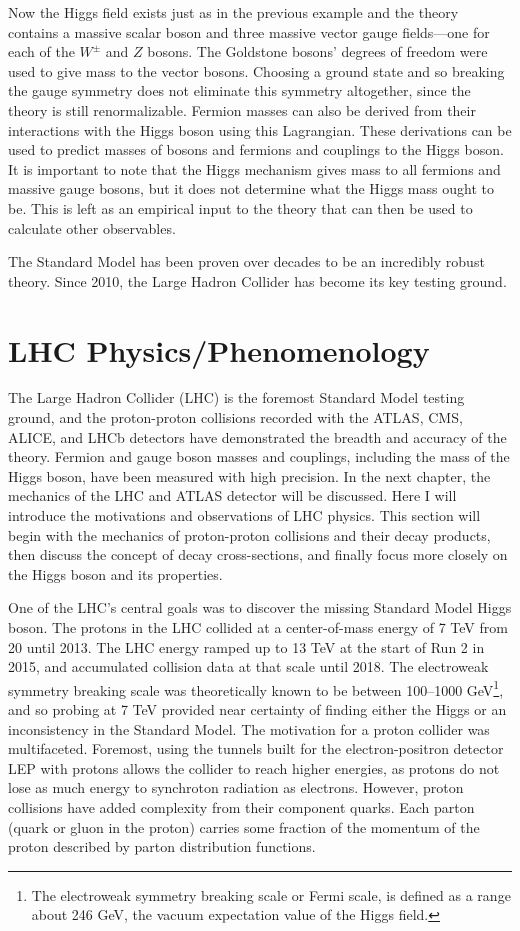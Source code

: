 Now the Higgs field exists just as in the previous example and the theory contains a massive scalar boson and three massive vector gauge fields---one for each of the $W^\pm$ and $Z$ bosons. The Goldstone bosons' degrees of freedom were used to give mass to the vector bosons. Choosing a ground state and so breaking the gauge symmetry does not eliminate this symmetry altogether, since the theory is still renormalizable. Fermion masses can also be derived from their interactions with the Higgs boson using this Lagrangian. These derivations can be used to predict masses of bosons and fermions and couplings to the Higgs boson. It is important to note that the Higgs mechanism gives mass to all fermions and massive gauge bosons, but it does not determine what the Higgs mass ought to be. This is left as an empirical input to the theory that can then be used to calculate other observables. 

The Standard Model has been proven over decades to be an incredibly robust theory. Since 2010, the Large Hadron Collider has become its key testing ground. 

\section{LHC Physics/Phenomenology}
The Large Hadron Collider (LHC) is the foremost Standard Model testing ground, and the proton-proton collisions recorded with the ATLAS, CMS, ALICE, and LHCb detectors have demonstrated the breadth and accuracy of the theory. Fermion and gauge boson masses and couplings, including the mass of the Higgs boson, have been measured with high precision. In the next chapter, the mechanics of the LHC and ATLAS detector will be discussed. Here I will introduce the motivations and observations of LHC physics. This section will begin with the mechanics of proton-proton collisions and their decay products, then discuss the concept of decay cross-sections, and finally focus more closely on the Higgs boson and its properties.

One of the LHC's central goals was to discover the missing Standard Model Higgs boson. The protons in the LHC collided at a center-of-mass energy of 7 TeV from 20 until 2013. The LHC energy ramped up to 13 TeV at the start of Run 2 in 2015, and accumulated collision data at that scale until 2018. The electroweak symmetry breaking scale was theoretically known to be between 100--1000 GeV\footnote{The electroweak symmetry breaking scale or Fermi scale, is defined as a range about 246 GeV, the vacuum expectation value of the Higgs field.}, and so probing at 7 TeV provided near certainty of finding either the Higgs or an inconsistency in the Standard Model. The motivation for a proton collider was multifaceted. Foremost, using the tunnels built for the electron-positron detector LEP with protons allows the collider to reach higher energies, as protons do not lose as much energy to synchroton radiation as electrons. However, proton collisions have added complexity from their component quarks. Each parton (quark or gluon in the proton) carries some fraction of the momentum of the proton described by parton distribution functions. 

